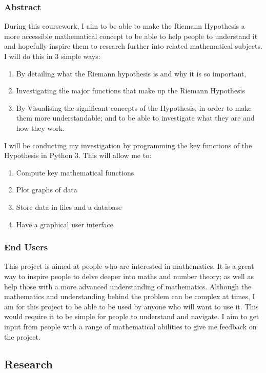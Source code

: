 \documentclass{article}
\begin{document}
\subsubsection{Abstract}

During this coursework, I aim to be able to make the Riemann Hypothesis a more accessible mathematical concept to be able to help people to understand it and hopefully inspire them to research further into related mathematical subjects. I will do this in 3 simple ways:
\begin{enumerate}
\item By detailing what the Riemann hypothesis is and why it is so important,
\item Investigating the major functions that make up the Riemann Hypothesis
\item By Visualising the significant concepts of the Hypothesis, in order to make them more understandable; and to be able to investigate what they are and how they work.
\end{enumerate}

I will be conducting my investigation by programming the key functions of the Hypothesis in Python 3. This will allow me to:
\begin{enumerate}
    \item Compute key mathematical functions
    \item Plot graphs of data
    \item Store data in files and a database
    \item Have a graphical user interface
\end{enumerate}

\subsubsection{End Users}

This project is aimed at people who are interested in mathematics. It is a great way to inspire people to delve deeper into maths and number theory; as well as help those with a more advanced understanding of mathematics. Although the mathematics and understanding behind the problem can be complex at times, I am for this project to be able to be used by anyone who will want to use it. This would require it to be simple for people to understand and navigate. I aim to get input from people with a range of mathematical abilities to give me feedback on the project.


\subsection{Research}
\end{document}
